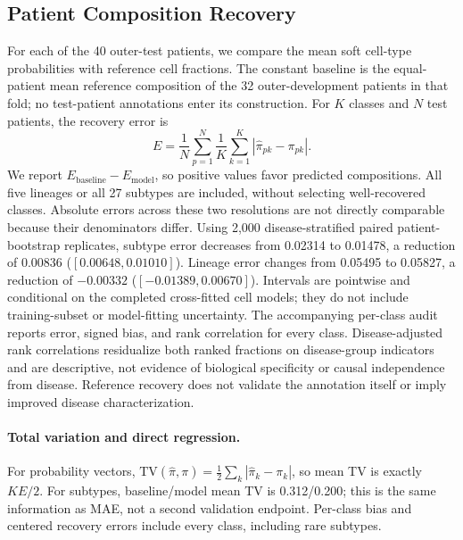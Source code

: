 \documentclass{article} %
\begin{document}
\subsection{Patient Composition Recovery}
\label{sec:appendix:composition_recovery}
For each of the 40 outer-test patients, we compare the mean soft cell-type
probabilities with reference cell fractions. The constant baseline is the
equal-patient mean reference composition of the 32 outer-development patients
in that fold; no test-patient annotations enter its construction. For $K$
classes and $N$ test patients, the recovery error is
\[
 E=\frac{1}{N}\sum_{p=1}^{N}\frac{1}{K}\sum_{k=1}^{K}
 |\widehat{\pi}_{pk}-\pi_{pk}|.
\]
We report $E_{\mathrm{baseline}}-E_{\mathrm{model}}$, so positive values favor
predicted compositions. All five lineages or all 27 subtypes are included,
without selecting well-recovered classes. Absolute errors across these two
resolutions are not directly comparable because their denominators differ.
Using 2,000 disease-stratified paired patient-bootstrap replicates, subtype
error decreases from 0.02314 to 0.01478, a reduction of 0.00836
($[0.00648,0.01010]$). Lineage error changes from 0.05495 to 0.05827, a
reduction of $-0.00332$ ($[-0.01389,0.00670]$). Intervals are pointwise and
conditional on the completed cross-fitted cell models; they do not include
training-subset or model-fitting uncertainty. The accompanying per-class
audit reports error, signed bias, and rank correlation for every class.
Disease-adjusted rank correlations residualize both ranked fractions on
disease-group indicators and are descriptive, not evidence of biological
specificity or causal independence from disease. Reference recovery does not
validate the annotation itself or imply improved disease characterization.

\paragraph{Total variation and direct regression.}
For probability vectors, $\mathrm{TV}(\widehat\pi,\pi)=
\tfrac12\sum_k|\widehat\pi_k-\pi_k|$, so mean TV is exactly $KE/2$.
For subtypes, baseline/model mean TV is 0.312/0.200; this is the same
information as MAE, not a second validation endpoint. Per-class bias and
centered recovery errors include every class, including rare subtypes.
\end{document}
